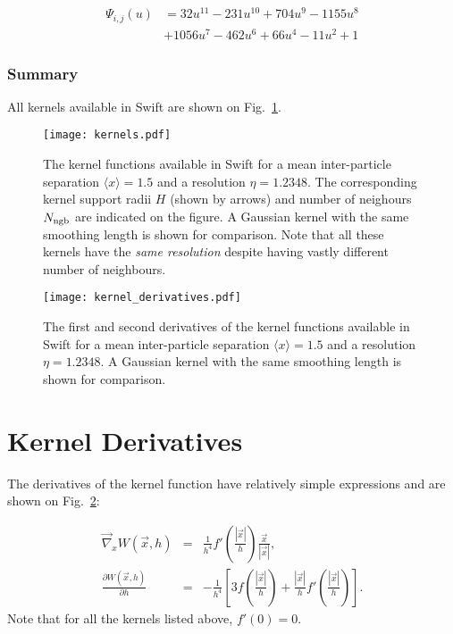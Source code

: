\documentclass[usenatbib, useAMS,a4paper]{mnras}
\newcommand{\swift}{{\sc Swift}\xspace}
\begin{document}
\begin{align}
  \Psi_{i,j}(u) &= 32u^{11} - 231u^{10} + 704u^9 - 1155u^8     \nonumber\\
  & + 1056u^7 - 462u^6 + 66u^4 - 11u^2 + 1
    \nonumber
\end{align}


\subsubsection{Summary}

All kernels available in \swift are shown on Fig.~\ref{fig:sph:kernels}.

\begin{figure}
\texttt{[image: kernels.pdf]}
\caption{The kernel functions available in \swift for a mean
  inter-particle separation $\langle x\rangle=1.5$ and a resolution
  $\eta=1.2348$. The corresponding kernel support radii $H$ (shown by
  arrows) and number of neighours $N_{\rm ngb}$ are indicated on the
  figure. A Gaussian kernel with the same smoothing length is shown
  for comparison. Note that all these kernels have the \emph{same
    resolution} despite having vastly different number of neighbours.}
\label{fig:sph:kernels}
\end{figure}

\begin{figure}
\texttt{[image: kernel\_derivatives.pdf]}
\caption{The first and second derivatives of the kernel functions
  available in \swift for a mean inter-particle separation $\langle
  x\rangle=1.5$ and a resolution $\eta=1.2348$.  A Gaussian kernel
  with the same smoothing length is shown for comparison.}
\label{fig:sph:kernel_derivatives}
\end{figure}


\section{Kernel Derivatives}

The derivatives of the kernel function have relatively simple
expressions and are shown on Fig.~\ref{fig:sph:kernel_derivatives}:

\begin{eqnarray*}
 \vec\nabla_x W(\vec{x},h) &=& \frac{1}{h^4}f'\left(\frac{|\vec{x}|}{h}\right) \frac{\vec{x}}{|\vec{x}|}, \\
 \frac{\partial W(\vec{x},h)}{\partial h} &=&- \frac{1}{h^4}\left[3f\left(\frac{|\vec{x}|}{h}\right) + 
\frac{|\vec{x}|}{h}f'\left(\frac{|\vec{x}|}{h}\right)\right].
\end{eqnarray*}
Note that for all the kernels listed above, $f'(0) = 0$. 



\end{document}
